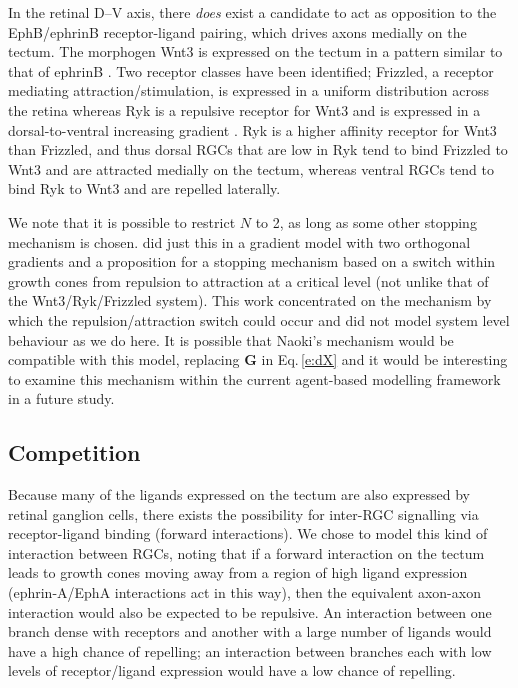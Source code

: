 \documentclass[9pt,lineno]{elife}
\begin{document}
In the retinal D--V axis, there \emph{does} exist a candidate to act as opposition to the EphB/ephrinB receptor-ligand pairing, which drives axons medially on the tectum. 
The morphogen Wnt3 is expressed on the tectum in a pattern similar to that of ephrinB \citep{schmitt_wntryk_2006}. 
Two receptor classes have been identified; Frizzled, a receptor mediating attraction/stimulation, is expressed in a uniform distribution across the retina whereas Ryk is a repulsive receptor for Wnt3 and is expressed in a dorsal-to-ventral increasing gradient \citep{schmitt_wntryk_2006}. Ryk is a higher affinity receptor for Wnt3 than Frizzled, and thus dorsal RGCs that are low in Ryk tend to bind Frizzled to Wnt3 and are attracted medially on the tectum, whereas ventral RGCs tend to bind Ryk to Wnt3 and are repelled laterally.

We note that it is possible to restrict $N$ to 2, as long as some other stopping mechanism is chosen. 
\citet{naoki_revisiting_2017} did just this in a gradient model with two orthogonal gradients and a proposition for a stopping mechanism based on a switch within growth cones from repulsion to attraction at a critical level (not unlike that of the Wnt3/Ryk/Frizzled system). 
This work concentrated on the mechanism by which the repulsion/attraction switch could occur and did not model system level behaviour as we do here. 
It is possible that Naoki's mechanism would be compatible with this model, replacing $\mathbf{G}$ in Eq.\,\ref{e:dX} and it would be interesting to examine this mechanism within the current agent-based modelling framework in a future study.

\subsection*{Competition}

Because many of the ligands expressed on the tectum are also expressed by retinal ganglion cells, there exists the possibility for inter-RGC signalling via receptor-ligand binding (forward interactions). 
We chose to model this kind of interaction between RGCs, noting that if a forward interaction on the tectum leads to growth cones moving away from a region of high ligand expression (ephrin-A/EphA interactions act in this way), then the equivalent axon-axon interaction would also be expected to be repulsive. An interaction between one branch dense with receptors and another with a large number of ligands would have a high chance of repelling; an interaction between branches each with low levels of receptor/ligand expression would have a low chance of repelling.
\end{document}
